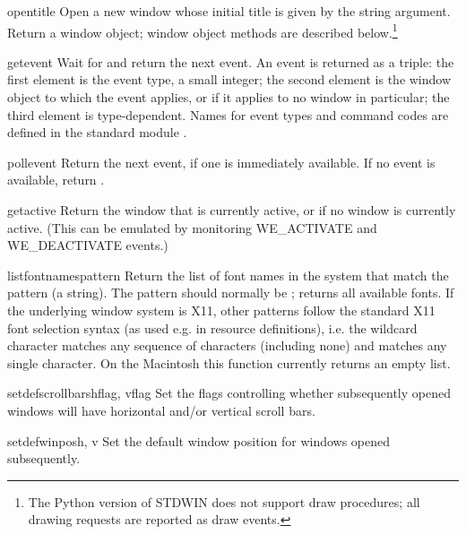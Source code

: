 \begin{funcdesc}{open}{title}
Open a new window whose initial title is given by the string argument.
Return a window object; window object methods are described
below.\footnote{
	The Python version of STDWIN does not support draw procedures;
	all drawing requests are reported as draw events.}
\end{funcdesc}

\begin{funcdesc}{getevent}{}
Wait for and return the next event.
An event is returned as a triple: the first element is the event
type, a small integer; the second element is the window object to which
the event applies, or
if it applies to no window in particular;
the third element is type-dependent.
Names for event types and command codes are defined in the standard
module .
\end{funcdesc}

\begin{funcdesc}{pollevent}{}
Return the next event, if one is immediately available.
If no event is available, return \code{()}.
\end{funcdesc}

\begin{funcdesc}{getactive}{}
Return the window that is currently active, or  if no
window is currently active.  (This can be emulated by monitoring
WE_ACTIVATE and WE_DEACTIVATE events.)
\end{funcdesc}

\begin{funcdesc}{listfontnames}{pattern}
Return the list of font names in the system that match the pattern (a
string).  The pattern should normally be ; returns all
available fonts.  If the underlying window system is X11, other
patterns follow the standard X11 font selection syntax (as used e.g.
in resource definitions), i.e. the wildcard character 
matches any sequence of characters (including none) and 
matches any single character.
On the Macintosh this function currently returns an empty list.
\end{funcdesc}

\begin{funcdesc}{setdefscrollbars}{hflag, vflag}
Set the flags controlling whether subsequently opened windows will
have horizontal and/or vertical scroll bars.
\end{funcdesc}

\begin{funcdesc}{setdefwinpos}{h, v}
Set the default window position for windows opened subsequently.
\end{funcdesc}

